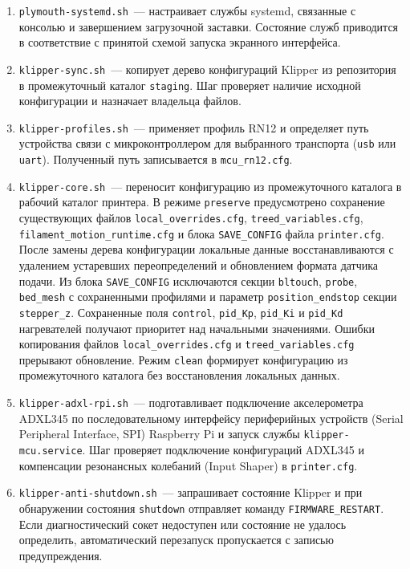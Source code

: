 \begin{enumerate}
\item \texttt{plymouth-systemd.sh}~--- настраивает службы systemd, связанные с консолью и завершением загрузочной заставки. Состояние служб приводится в соответствие с принятой схемой запуска экранного интерфейса.
\item \texttt{klipper-sync.sh}~--- копирует дерево конфигураций Klipper из репозитория в промежуточный каталог \texttt{staging}. Шаг проверяет наличие исходной конфигурации и назначает владельца файлов.
\item \texttt{klipper-profiles.sh}~--- применяет профиль RN12 и определяет путь устройства связи с микроконтроллером для выбранного транспорта (\texttt{usb} или \texttt{uart}). Полученный путь записывается в \texttt{mcu\_rn12.cfg}.
\item \texttt{klipper-core.sh}~--- переносит конфигурацию из промежуточного каталога в рабочий каталог принтера. В режиме \texttt{preserve} предусмотрено сохранение существующих файлов \texttt{local\_overrides.cfg}, \texttt{treed\_variables.cfg}, \texttt{filament\_motion\_runtime.cfg} и блока \texttt{SAVE\_CONFIG} файла \texttt{printer.cfg}. После замены дерева конфигурации локальные данные восстанавливаются с удалением устаревших переопределений и обновлением формата датчика подачи. Из блока \texttt{SAVE\_CONFIG} исключаются секции \texttt{bltouch}, \texttt{probe}, \texttt{bed\_mesh} с сохраненными профилями и параметр \texttt{position\_endstop} секции \texttt{stepper\_z}. Сохраненные поля \texttt{control}, \texttt{pid\_Kp}, \texttt{pid\_Ki} и \texttt{pid\_Kd} нагревателей получают приоритет над начальными значениями. Ошибки копирования файлов \texttt{local\_overrides.cfg} и \texttt{treed\_variables.cfg} прерывают обновление. Режим \texttt{clean} формирует конфигурацию из промежуточного каталога без восстановления локальных данных.
\item \texttt{klipper-adxl-rpi.sh}~--- подготавливает подключение акселерометра ADXL345 по последовательному интерфейсу периферийных устройств (Serial Peripheral Interface, SPI) Raspberry Pi и запуск службы \texttt{klipper-mcu.service}. Шаг проверяет подключение конфигураций ADXL345 и компенсации резонансных колебаний (Input Shaper) в \texttt{printer.cfg}.
\item \texttt{klipper-anti-shutdown.sh}~--- запрашивает состояние Klipper и при обнаружении состояния \texttt{shutdown} отправляет команду \texttt{FIRMWARE\_RESTART}. Если диагностический сокет недоступен или состояние не удалось определить, автоматический перезапуск пропускается с записью предупреждения.

\end{enumerate}
